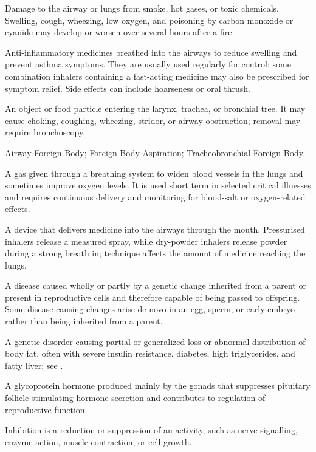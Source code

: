  Damage to the airway or lungs from smoke, hot gases, or toxic chemicals. Swelling, cough, wheezing, low oxygen, and poisoning by carbon monoxide or cyanide may develop or worsen over several hours after a fire.

 Anti-inflammatory medicines breathed into the airways to reduce swelling and prevent asthma symptoms. They are usually used regularly for control; some combination inhalers containing a fast-acting medicine may also be prescribed for symptom relief. Side effects can include hoarseness or oral thrush.

 An object or food particle entering the larynx, trachea, or bronchial tree. It may cause choking, coughing, wheezing, stridor, or airway obstruction; removal may require bronchoscopy.

\synonyms
Airway Foreign Body; Foreign Body Aspiration; Tracheobronchial Foreign Body

 A gas given through a breathing system to widen blood vessels in the lungs and sometimes improve oxygen levels. It is used short term in selected critical illnesses and requires continuous delivery and monitoring for blood-salt or oxygen-related effects.

 A device that delivers medicine into the airways through the mouth. Pressurised inhalers release a measured spray, while dry-powder inhalers release powder during a strong breath in; technique affects the amount of medicine reaching the lungs.

 A disease caused wholly or partly by a genetic change inherited from a parent or present in reproductive cells and therefore capable of being passed to offspring. Some disease-causing changes arise de novo in an egg, sperm, or early embryo rather than being inherited from a parent.

 A genetic disorder causing partial or generalized loss or abnormal distribution of body fat, often with severe insulin resistance, diabetes, high triglycerides, and fatty liver; see .

 A glycoprotein hormone produced mainly by the gonads that suppresses pituitary follicle-stimulating hormone secretion and contributes to regulation of reproductive function.

 Inhibition is a reduction or suppression of an activity, such as nerve signalling, enzyme action, muscle contraction, or cell growth.

